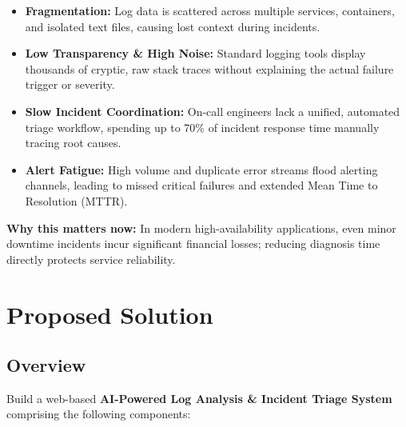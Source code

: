 \documentclass[11pt,a4paper]{article}
\begin{document}
\begin{itemize}[leftmargin=0.7cm]

\item \textbf{Fragmentation:} Log data is scattered across multiple services, containers, and isolated text files, causing lost context during incidents.

\item \textbf{Low Transparency \& High Noise:} Standard logging tools display thousands of cryptic, raw stack traces without explaining the actual failure trigger or severity.

\item \textbf{Slow Incident Coordination:} On-call engineers lack a unified, automated triage workflow, spending up to 70\% of incident response time manually tracing root causes.

\item \textbf{Alert Fatigue:} High volume and duplicate error streams flood alerting channels, leading to missed critical failures and extended Mean Time to Resolution (MTTR).

\end{itemize}

\textbf{Why this matters now:} In modern high-availability applications, even minor downtime incidents incur significant financial losses; reducing diagnosis time directly protects service reliability.


\section{Proposed Solution}

\subsection{Overview}

Build a web-based \textbf{AI-Powered Log Analysis \& Incident Triage System} comprising the following components:
\end{document}
